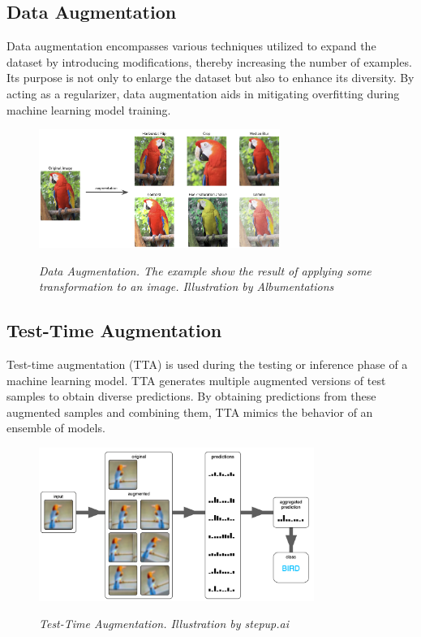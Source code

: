 \newpage

\subsection{Data Augmentation}

Data augmentation encompasses various techniques utilized to expand the dataset by introducing modifications, thereby increasing the number of examples. Its purpose is not only to enlarge the dataset but also to enhance its diversity. By acting as a regularizer, data augmentation aids in mitigating overfitting during machine learning model training.

\begin{figure}[H]
\centering
\includegraphics[width=0.7\textwidth]{imatges/preliminaries/augmentation.jpg}
\caption[Data Augmentation]{\textit{Data Augmentation. The example show the result of applying some transformation to an image. Illustration by Albumentations}}
{\label{fig:augmentation}}
\end{figure}


\subsection{Test-Time Augmentation}

Test-time augmentation (TTA) is used during the testing or inference phase of a machine learning model. TTA generates multiple augmented versions of test samples to obtain diverse predictions. By obtaining predictions from these augmented samples and combining them, TTA mimics the behavior of an ensemble of models.

\begin{figure}[H]
\centering
\includegraphics[width=0.8\textwidth]{imatges/preliminaries/tta.png}
\caption[Test-Time Augmentation]{\textit{Test-Time Augmentation. Illustration by stepup.ai}}
{\label{fig:tta}}
\end{figure}

